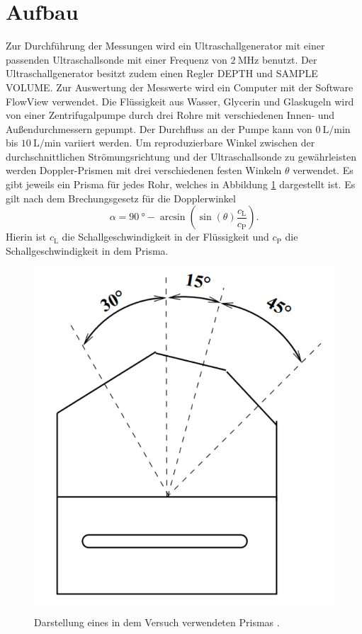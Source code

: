 \section{Aufbau}
\label{sec:Aufbau}
Zur Durchführung der Messungen wird ein Ultraschallgenerator mit einer passenden Ultraschallsonde mit einer Frequenz von $\SI{2}{\mega\hertz}$ benutzt. Der Ultraschallgenerator besitzt zudem einen Regler DEPTH und SAMPLE VOLUME. Zur Auswertung der Messwerte wird ein Computer mit der Software FlowView verwendet. Die Flüssigkeit aus Wasser, Glycerin und Glaskugeln wird von einer Zentrifugalpumpe durch drei Rohre mit verschiedenen Innen- und Außendurchmessern gepumpt. Der Durchfluss an der Pumpe kann von $\SI{0}{\liter\per\minute}$ bis $\SI{10}{\liter\per\minute}$ variiert werden. Um reproduzierbare Winkel zwischen der durchschnittlichen Strömungsrichtung und der Ultraschallsonde zu gewährleisten werden Doppler-Prismen mit drei verschiedenen festen Winkeln $\theta$ verwendet. Es gibt jeweils ein Prisma für jedes Rohr, welches in Abbildung \ref{fig:prisma} dargestellt ist. Es gilt nach dem Brechungsgesetz für die Dopplerwinkel 
\begin{equation}
	\alpha = \SI{90}{\degree} - \arcsin\left(\sin(\theta) \frac{c_\text{L}}{c_\text{P}}\right)\text{.}
\end{equation}
Hierin ist $c_\text{L}$ die Schallgeschwindigkeit in der Flüssigkeit und $c_\text{P}$ die Schallgeschwindigkeit in dem Prisma.
\begin{figure}
	\centering
	\caption{Darstellung eines in dem Versuch verwendeten Prismas \cite{US3}.}
	\includegraphics[width=\linewidth-70pt,height=0.3\textheight,keepaspectratio]{content/images/prisma.png}
	\label{fig:prisma}
\end{figure}